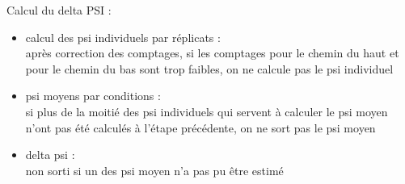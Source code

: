 \documentclass[a4paper,10pt]{article}
\begin{document}
 Calcul du delta PSI :
 \begin{itemize}
\item calcul des psi individuels par réplicats :\\
après correction des comptages, si les comptages pour le chemin du haut et pour le chemin du bas sont trop faibles, on ne calcule pas le psi individuel
\item psi moyens par conditions :\\
 si plus de la moitié des psi individuels qui servent à calculer le psi moyen n'ont pas été calculés à l'étape précédente, on ne sort pas le psi moyen
\item delta psi :\\
non sorti si un des psi moyen n'a pas pu être estimé
\end{itemize}
\end{document}
